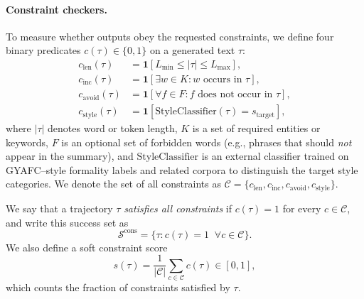 \paragraph{Constraint checkers.}
To measure whether outputs obey the requested constraints, we define four
binary predicates $c(\tau)\in\{0,1\}$ on a generated text $\tau$:
\begin{align}
c_{\text{len}}(\tau) &= \mathbf{1}[L_{\min} \le |\tau| \le L_{\max}], \\
c_{\text{inc}}(\tau) &= \mathbf{1}[\exists w\in K: w \text{ occurs in } \tau], \\
c_{\text{avoid}}(\tau) &= \mathbf{1}[\forall f\in F: f \text{ does not occur in } \tau], \\
c_{\text{style}}(\tau) &= \mathbf{1}[\text{StyleClassifier}(\tau) = s_{\text{target}}],
\end{align}
where $|\tau|$ denotes word or token length, $K$ is a set of required entities
or keywords, $F$ is an optional set of forbidden words (e.g., phrases that
should \emph{not} appear in the summary), and
$\text{StyleClassifier}$ is an external classifier trained on GYAFC--style
formality labels and related corpora to distinguish the target style
categories. We denote the set of all constraints as
$\mathcal{C} = \{c_{\text{len}}, c_{\text{inc}}, c_{\text{avoid}},
c_{\text{style}}\}$.

We say that a trajectory $\tau$ \emph{satisfies all constraints} if
$c(\tau){=}1$ for every $c\in\mathcal{C}$, and write this success set as
\[
\mathcal{S}^{\text{cons}}
= \{\tau : c(\tau)=1\;\;\forall c\in\mathcal{C}\}.
\]
We also define a soft constraint score
\[
s(\tau) = \frac{1}{|\mathcal{C}|}\sum_{c\in\mathcal{C}} c(\tau)
\in [0,1],
\]
which counts the fraction of constraints satisfied by $\tau$.

